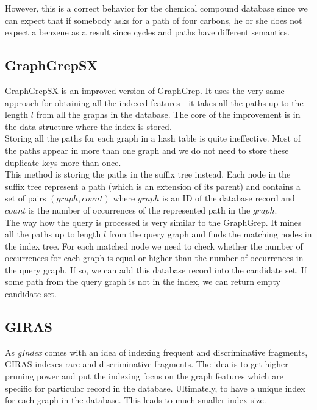 However, this is a correct behavior for the chemical compound database since we can expect that if somebody asks for a path of four carbons, he or she does not expect a benzene as a result since cycles and paths have different semantics.

\subsection{GraphGrepSX}

GraphGrepSX is an improved version of GraphGrep. It uses the very same approach for obtaining all the indexed features - it takes all the paths up to the length $l$ from all the graphs in the database. The core of the improvement is in the data structure where the index is stored.\\

Storing all the paths for each graph in a hash table is quite ineffective. Most of the paths appear in more than one graph and we do not need to store these duplicate keys more than once.\\

This method is storing the paths in the suffix tree instead. Each node in the suffix tree represent a path (which is an extension of its parent) and contains a set of pairs $(graph, count)$ where $graph$ is an ID of the database record and $count$ is the number of occurrences of the represented path in the $graph$.\\

The way how the query is processed is very similar to the GraphGrep. It mines all the paths up to length $l$ from the query graph and finds the matching nodes in the index tree. For each matched node we need to check whether the number of occurrences for each graph is equal or higher than the number of occurrences in the query graph. If so, we can add this database record into the candidate set. If some path from the query graph is not in the index, we can return empty candidate set.

\subsection{GIRAS}

As \textit{gIndex} comes with an idea of indexing frequent and discriminative fragments, GIRAS indexes rare and discriminative fragments. The idea is to get higher pruning power and put the indexing focus on the graph features which are specific for particular record in the database. Ultimately, to have a unique index for each graph in the database. This leads to much smaller index size.\\

